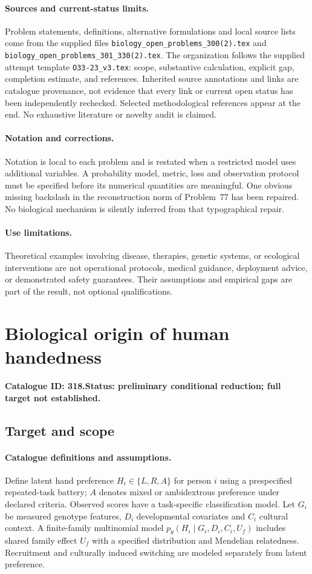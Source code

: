\documentclass[11pt]{article}
\begin{document}
\paragraph{Sources and current-status limits.}
Problem statements, definitions, alternative formulations and local source lists
come from the supplied files
\texttt{biology\_open\_problems\_300(2).tex} and
\texttt{biology\_open\_problems\_301\_330(2).tex}.
The organization follows the supplied attempt template
\texttt{O33-23\_v3.tex}: scope, substantive calculation, explicit gap,
completion estimate, and references. Inherited source annotations and links are
catalogue provenance, not evidence that every link or current open status has
been independently rechecked. Selected methodological references appear at the
end. No exhaustive literature or novelty audit is claimed.

\paragraph{Notation and corrections.}
Notation is local to each problem and is restated when a restricted model uses
additional variables. A probability model, metric, loss and observation protocol
must be specified before its numerical quantities are meaningful. One obvious
missing backslash in the reconstruction norm of Problem~77 has been repaired.
No biological mechanism is silently inferred from that typographical repair.

\paragraph{Use limitations.}
Theoretical examples involving disease, therapies, genetic systems, or ecological
interventions are not operational protocols, medical guidance, deployment advice,
or demonstrated safety guarantees. Their assumptions and empirical gaps are part
of the result, not optional qualifications.

\setcounter{section}{317}
\section{Biological origin of human handedness}
\label{prob:318}
\noindent\textbf{Catalogue ID: 318.}\quad \textbf{Status: preliminary conditional reduction; full target not established.}
\subsection{Target and scope}
\paragraph{Catalogue definitions and assumptions.}
Define latent hand preference $H_i\in\{L,R,A\}$ for person $i$ using a prespecified repeated-task battery; $A$ denotes mixed or ambidextrous preference under declared criteria. Observed scores have a task-specific classification model. Let $G_i$ be measured genotype features, $D_i$ developmental covariates and $C_i$ cultural context. A finite-family multinomial model $p_\theta(H_i\mid G_i,D_i,C_i,U_f)$ includes shared family effect $U_f$ with a specified distribution and Mendelian relatedness. Recruitment and culturally induced switching are modeled separately from latent preference.
\end{document}
